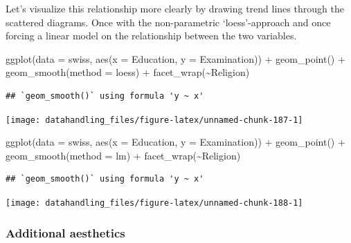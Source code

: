 \documentclass[
  12pt,
]{style/krantz}
\newenvironment{Shaded}{\begin{snugshade}}{\end{snugshade}}
\newcommand{\AttributeTok}[1]{\textcolor[rgb]{0.77,0.63,0.00}{#1}}
\newcommand{\FunctionTok}[1]{\textcolor[rgb]{0.00,0.00,0.00}{#1}}
\newcommand{\NormalTok}[1]{#1}
\newcommand{\SpecialCharTok}[1]{\textcolor[rgb]{0.00,0.00,0.00}{#1}}
\newcommand{\StringTok}[1]{\textcolor[rgb]{0.31,0.60,0.02}{#1}}
\begin{document}
Let's visualize this relationship more clearly by drawing trend lines through the scattered diagrams. Once with the non-parametric `loess'-approach and once forcing a linear model on the relationship between the two variables.

\begin{Shaded}
\begin{Highlighting}[]
\FunctionTok{ggplot}\NormalTok{(}\AttributeTok{data =}\NormalTok{ swiss, }\FunctionTok{aes}\NormalTok{(}\AttributeTok{x =}\NormalTok{ Education, }\AttributeTok{y =}\NormalTok{ Examination)) }\SpecialCharTok{+}
     \FunctionTok{geom\_point}\NormalTok{() }\SpecialCharTok{+}
     \FunctionTok{geom\_smooth}\NormalTok{(}\AttributeTok{method =} \StringTok{\textquotesingle{}loess\textquotesingle{}}\NormalTok{) }\SpecialCharTok{+}
     \FunctionTok{facet\_wrap}\NormalTok{(}\SpecialCharTok{\textasciitilde{}}\NormalTok{Religion)}
\end{Highlighting}
\end{Shaded}

\begin{verbatim}
## `geom_smooth()` using formula 'y ~ x'
\end{verbatim}

\texttt{[image: datahandling\_files/figure-latex/unnamed-chunk-187-1]}

\begin{Shaded}
\begin{Highlighting}[]
\FunctionTok{ggplot}\NormalTok{(}\AttributeTok{data =}\NormalTok{ swiss, }\FunctionTok{aes}\NormalTok{(}\AttributeTok{x =}\NormalTok{ Education, }\AttributeTok{y =}\NormalTok{ Examination)) }\SpecialCharTok{+}
     \FunctionTok{geom\_point}\NormalTok{() }\SpecialCharTok{+}
     \FunctionTok{geom\_smooth}\NormalTok{(}\AttributeTok{method =} \StringTok{\textquotesingle{}lm\textquotesingle{}}\NormalTok{) }\SpecialCharTok{+}
     \FunctionTok{facet\_wrap}\NormalTok{(}\SpecialCharTok{\textasciitilde{}}\NormalTok{Religion)}
\end{Highlighting}
\end{Shaded}

\begin{verbatim}
## `geom_smooth()` using formula 'y ~ x'
\end{verbatim}

\texttt{[image: datahandling\_files/figure-latex/unnamed-chunk-188-1]}

\hypertarget{additional-aesthetics}{%
\subsubsection{Additional aesthetics}\label{additional-aesthetics}}
\end{document}
